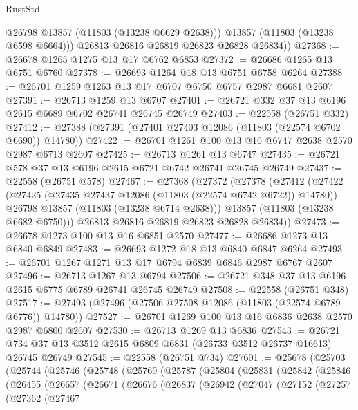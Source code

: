 \begin{lexlean}{RustStd}
\begin{coremodule}
            @26798
            @13857
            (@11803 (@13238 @6629 @2638)))
          @13857
          (@11803 (@13238 @6598 @6664)))
        @26813
        @26816
        @26819
        @26823
        @26828
        @26834))
@27368 := @26678 @1265 @1275 @13 @17 @6762 @6853
@27372 := @26686 @1265 @13 @6751 @6760
@27378 := @26693 @1264 @18 @13 @6751 @6758 @6264
@27388 := @26701 @1259 @1263 @13 @17 @6707 @6750 @6757 @2987 @6681 @2607
@27391 := @26713 @1259 @13 @6707
@27401 := @26721 @332 @37 @13 @6196 @2615 @6689 @6702 @26741 @26745 @26749
@27403 := @22558 (@26751 @332)
@27412 := @27388 (@27391 (@27401 @27403 @12086 (@11803 (@22574 @6702 @6690)) @14780))
@27422 := @26701 @1261 @100 @13 @16 @6747 @2638 @2570 @2987 @6713 @2607
@27425 := @26713 @1261 @13 @6747
@27435 := @26721 @578 @37 @13 @6196 @2615 @6721 @6742 @26741 @26745 @26749
@27437 := @22558 (@26751 @578)
@27467 := @27368
    (@27372
      (@27378
        (@27412
          (@27422
            (@27425 (@27435 @27437 @12086 (@11803 (@22574 @6742 @6722)) @14780))
            @26798
            @13857
            (@11803 (@13238 @6714 @2638)))
          @13857
          (@11803 (@13238 @6682 @6750)))
        @26813
        @26816
        @26819
        @26823
        @26828
        @26834))
@27473 := @26678 @1273 @100 @13 @16 @6851 @2570
@27477 := @26686 @1273 @13 @6840 @6849
@27483 := @26693 @1272 @18 @13 @6840 @6847 @6264
@27493 := @26701 @1267 @1271 @13 @17 @6794 @6839 @6846 @2987 @6767 @2607
@27496 := @26713 @1267 @13 @6794
@27506 := @26721 @348 @37 @13 @6196 @2615 @6775 @6789 @26741 @26745 @26749
@27508 := @22558 (@26751 @348)
@27517 := @27493 (@27496 (@27506 @27508 @12086 (@11803 (@22574 @6789 @6776)) @14780))
@27527 := @26701 @1269 @100 @13 @16 @6836 @2638 @2570 @2987 @6800 @2607
@27530 := @26713 @1269 @13 @6836
@27543 := @26721 @734 @37 @13 @3512 @2615 @6809 @6831 (@26733 @3512 @26737 @16613) @26745 @26749
@27545 := @22558 (@26751 @734)
@27601 := @25678
    (@25703
      (@25744
        (@25746
          (@25748
            (@25769
              (@25787
                (@25804
                  (@25831
                    (@25842
                      (@25846
                        (@26455
                          (@26657
                            (@26671
                              (@26676
                                (@26837
                                  (@26942
                                    (@27047
                                      (@27152
                                        (@27257
                                          (@27362
                                            (@27467

\end{coremodule}
\end{lexlean}
